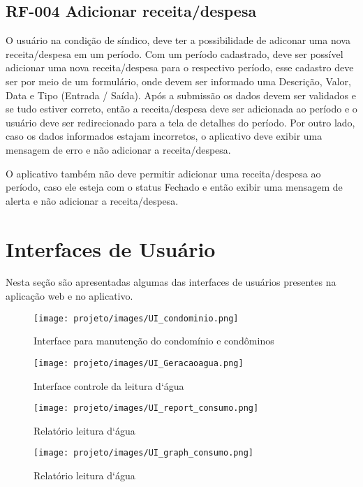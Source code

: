 \documentclass[12pt]{article}
\begin{document}
\begin{appendices}
\subsection{RF-004 Adicionar receita/despesa}
O usuário na condição de síndico, deve ter a possibilidade de adiconar uma nova receita/despesa em um período.
Com um período cadastrado, deve ser possível adicionar uma nova receita/despesa para o respectivo período, esse cadastro deve ser por meio de um formulário, onde devem ser informado uma Descrição, Valor, Data e Tipo (Entrada / Saída). Após a submissão os dados devem ser validados e se tudo estiver correto, então a receita/despesa deve ser adicionada ao período e o usuário deve ser redirecionado para a tela de detalhes do período.
Por outro lado, caso os dados informados estajam incorretos, o aplicativo deve exibir uma mensagem de erro e não adicionar a receita/despesa.

O aplicativo também não deve permitir adicionar uma receita/despesa ao período, caso ele esteja com o status Fechado e então exibir uma mensagem de alerta e não adicionar a receita/despesa.

\section{Interfaces de Usuário}
Nesta seção são apresentadas algumas das interfaces de usuários presentes na aplicação web e no aplicativo.

\begin{figure}[!ht]
  \centering
  \texttt{[image: projeto/images/UI\_condominio.png]}
  \caption{Interface para manutenção do condomínio e condôminos}
  \label{fig:UI_condominio}
\end{figure}

\begin{figure}[!ht]
  \centering
  \texttt{[image: projeto/images/UI\_Geracaoagua.png]}
  \caption{Interface controle da leitura d`água}
  \label{fig:UI_Geracaoagua}
\end{figure}

\begin{figure}[!ht]
  \centering
  \texttt{[image: projeto/images/UI\_report\_consumo.png]}
  \caption{Relatório leitura d`água}
  \label{fig:UI_report_consumo}
\end{figure}

\begin{figure}[!ht]
  \centering
  \texttt{[image: projeto/images/UI\_graph\_consumo.png]}
  \caption{Relatório leitura d`água}
  \label{fig:UI_graph_consumo}
\end{figure}


\end{appendices}
\end{document}
